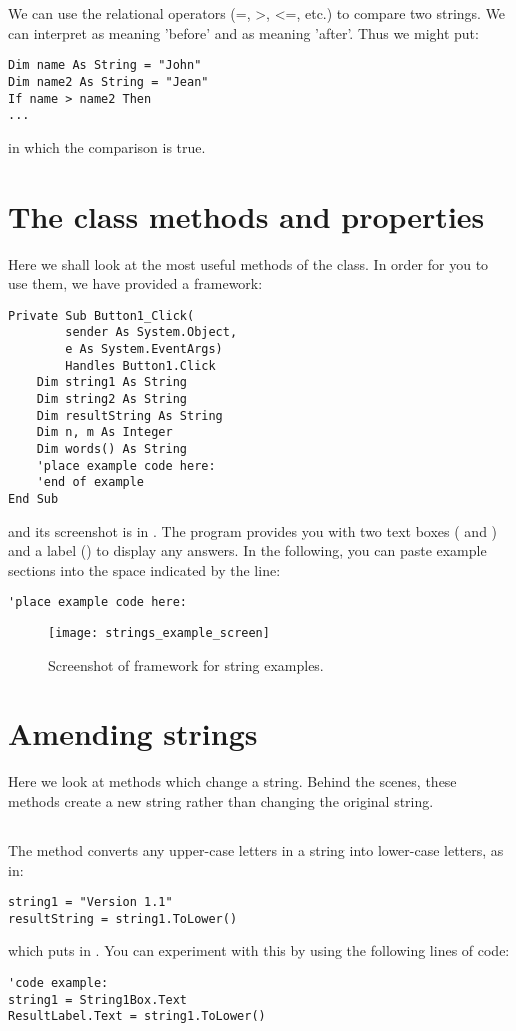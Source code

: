 		
		We can use the relational operators (=, >, <=, etc.) to compare two strings. We can interpret \keyword{<} as meaning 'before' and \keyword{>} as meaning 'after'. Thus we might put:
		\begin{lstlisting}
Dim name As String = "John"
Dim name2 As String = "Jean"
If name > name2 Then
...
		\end{lstlisting}
		in which the comparison is true.


	\section{The  class methods and properties}
		Here we shall look at the most useful methods of the  class. In order for you to use them, we have provided a framework:
		\begin{lstlisting}
Private Sub Button1_Click(
		sender As System.Object,
		e As System.EventArgs)
		Handles Button1.Click
	Dim string1 As String
	Dim string2 As String
	Dim resultString As String
	Dim n, m As Integer
	Dim words() As String
	'place example code here:
	'end of example
End Sub
		\end{lstlisting}
		and its screenshot is in . The program provides you with two text boxes ( and ) and a label () to display any answers. In the following, you can paste example sections into the space indicated by the line:
		\begin{lstlisting}
'place example code here:
		\end{lstlisting}


		\begin{figure}[bth]
			\centering
			\texttt{[image: strings\_example\_screen]}
			\caption{Screenshot of framework for string examples.}
			\label{fig:strings_example_screen}
		\end{figure}

		
	\section{Amending strings}
		Here we look at methods which change a string. Behind the scenes, these methods create a new string rather than changing the original string.

		\subsection*{}
			The  method converts any upper-case letters in a string into lower-case letters, as in:
			\begin{lstlisting}
string1 = "Version 1.1"
resultString = string1.ToLower()
			\end{lstlisting}
			which puts  in . You can experiment with this by using the following lines of code:
			\begin{lstlisting}
'code example:
string1 = String1Box.Text
ResultLabel.Text = string1.ToLower()
			\end{lstlisting}

